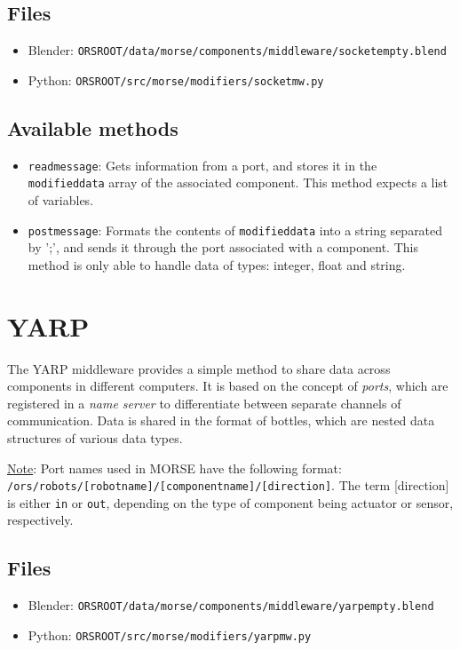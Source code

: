 \documentclass[twoside,a4paper,10pt]{report}
\newcommand{\dokutitlelevelone}[1]{\chapter{#1}}
\newcommand{\dokutitleleveltwo}[1]{\section{#1}}
\newcommand{\dokuitalic}[1]{\textsl{#1}}
\newcommand{\dokumonospace}[1]{\texttt{#1}}
\newcommand{\dokuunderline}[1]{\underline{#1}}
\newcommand{\dokuitem}{\item}
\begin{document}
\dokutitleleveltwo{Files}
\label{45b963397aa40d4a0063e0d85e4fe7a1}%

\begin{itemize}
\dokuitem  Blender: \dokumonospace{{\textdollar}ORS{\textunderscore}ROOT/data/morse/components/middleware/socket{\textunderscore}empty.blend}
\dokuitem  Python: \dokumonospace{{\textdollar}ORS{\textunderscore}ROOT/src/morse/modifiers/socket{\textunderscore}mw.py}
\end{itemize}

\dokutitleleveltwo{Available methods}
\label{a2d06dcb42bbd0519b19166fd7f36cea}%

\begin{itemize}
\dokuitem  \dokumonospace{read{\textunderscore}message}: Gets information from a port, and stores it in the \dokumonospace{modified{\textunderscore}data} array of the associated component. This method expects a list of variables.
\dokuitem  \dokumonospace{post{\textunderscore}message}: Formats the contents of \dokumonospace{modified{\textunderscore}data} into a string separated by ';', and sends it through the port associated with a component. This method is only able to handle data of types: integer, float and string.
\end{itemize}

\dokutitlelevelone{YARP}
\label{ec46d0b85077d7a7fe8da2e2b4c70462}%
\label{ec46d0b85077d7a7fe8da2e2b4c70462}%
The YARP middleware provides a simple method to share data across components in different computers. It is based on the concept of \dokuitalic{ports}, which are registered in a \dokuitalic{name server} to differentiate between separate channels of communication.
Data is shared in the format of bottles, which are nested data structures of various data types.

\dokuunderline{Note}: Port names used in MORSE have the following format: \dokumonospace{/ors/robots/[robot{\textunderscore}name]/[component{\textunderscore}name]/[direction]}. The term [direction] is either \dokumonospace{in} or \dokumonospace{out}, depending on the type of component being actuator or sensor, respectively.


\dokutitleleveltwo{Files}
\label{45b963397aa40d4a0063e0d85e4fe7a1}%

\begin{itemize}
\dokuitem  Blender: \dokumonospace{{\textdollar}ORS{\textunderscore}ROOT/data/morse/components/middleware/yarp{\textunderscore}empty.blend}
\dokuitem  Python: \dokumonospace{{\textdollar}ORS{\textunderscore}ROOT/src/morse/modifiers/yarp{\textunderscore}mw.py}
\end{itemize}
\end{document}
